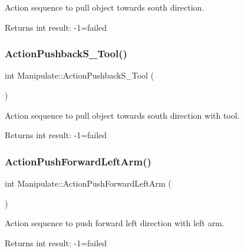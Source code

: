 Action sequence to pull object towards south direction. 

\begin{DoxyReturn}{Returns}
int result\+: -\/1=failed 
\end{DoxyReturn}
\mbox{\label{structManipulate_a93385c3e5e0efd1524cde27fccfb6097}} 
\subsubsection{\texorpdfstring{Action\+Pushback\+S\+\_\+\+Tool()}{ActionPushbackS\_Tool()}}
{\footnotesize\ttfamily int Manipulate\+::\+Action\+Pushback\+S\+\_\+\+Tool (\begin{DoxyParamCaption}{ }\end{DoxyParamCaption})\hspace{0.3cm}{\ttfamily [private]}}



Action sequence to pull object towards south direction with tool. 

\begin{DoxyReturn}{Returns}
int result\+: -\/1=failed 
\end{DoxyReturn}
\mbox{\label{structManipulate_aee20bd1d48720fa28e12abbe42fdef57}} 
\subsubsection{\texorpdfstring{Action\+Push\+Forward\+Left\+Arm()}{ActionPushForwardLeftArm()}}
{\footnotesize\ttfamily int Manipulate\+::\+Action\+Push\+Forward\+Left\+Arm (\begin{DoxyParamCaption}{ }\end{DoxyParamCaption})\hspace{0.3cm}{\ttfamily [private]}}



Action sequence to push forward left direction with left arm. 

\begin{DoxyReturn}{Returns}
int result\+: -\/1=failed 
\end{DoxyReturn}
\mbox{\label{structManipulate_a187b5b722ac34bb0718478120b0a4262}} 
